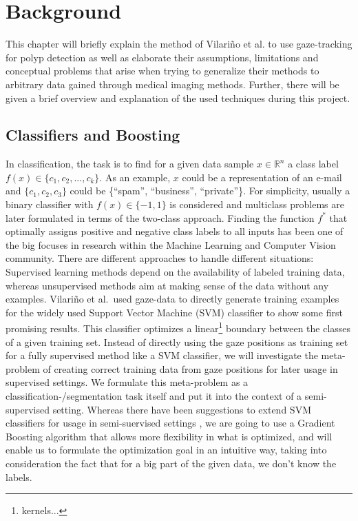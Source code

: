 \chapter{Background}
\label{chap:background}
This chapter will briefly explain the method of Vilari\~no et al. to use gaze-tracking for polyp detection as well as elaborate their assumptions, limitations and conceptual problems that arise when trying to generalize their methods to arbitrary data gained through medical imaging methods. Further, there will be given a brief overview and explanation of the used techniques during this project.

\section{Classifiers and Boosting}
In classification, the task is to find for a given data sample $x \in \mathbb{R}^n$ a class label $f(x) \in \{c_1, c_2, ..., c_k\}$. As an example, $x$ could be a representation of an e-mail and $\{c_1,c_2,c_3\}$ could be \{``spam'', ``business'', ``private''\}. For simplicity, usually a binary classifier with $f(x) \in \{-1,1\}$ is considered and multiclass problems are later formulated in terms of the two-class approach.  
Finding the function $f^*$ that optimally assigns positive and negative class labels to all inputs has been one of the big focuses in research within the Machine Learning and Computer Vision community. There are different approaches to handle different situations: Supervised learning methods depend on the availability of labeled training data, whereas unsupervised methods aim at making sense of the data without any examples. 
Vilari\~no et al.\ used gaze-data to directly generate training examples for the widely used Support Vector Machine (SVM) classifier to show some first promising results. 
This classifier optimizes a linear\footnote{kernels...} boundary between the classes of a given training set. Instead of directly using the gaze positions as training set for a fully supervised method like a SVM classifier, we will investigate the meta-problem of creating correct training data from gaze positions for later usage in supervised settings. 
We formulate this meta-problem as a classification-/segmentation task itself and put it into the context of a semi-supervised setting. 
Whereas there have been suggestions to extend SVM classifiers for usage in semi-suervised settings , we are going to use a Gradient Boosting algorithm that allows more flexibility in what is optimized, and will enable us to formulate the optimization goal in an intuitive way, taking into consideration the fact that for a big part of the given data, we don't know the labels.

